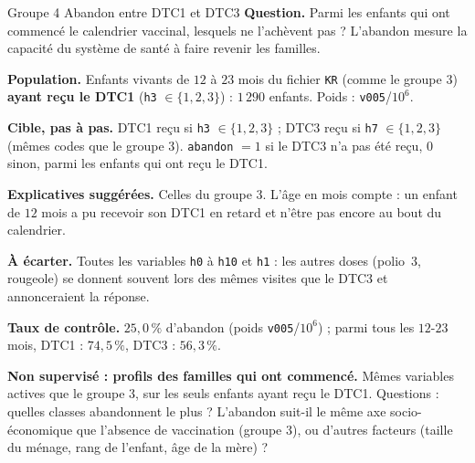 \documentclass[11pt]{article}
\begin{document}
\begin{fiche}{Groupe 4 \textendash{} Abandon entre DTC1 et DTC3}
\textbf{Question.} Parmi les enfants qui ont commencé le calendrier vaccinal, lesquels ne l'achèvent pas ? L'abandon mesure la capacité du système de santé à faire revenir les familles.

\textbf{Population.} Enfants vivants de $12$ à $23$ mois du fichier \texttt{KR} (comme le groupe 3) \textbf{ayant reçu le DTC1} (\texttt{h3} $\in\{1,2,3\}$) : $1\,290$ enfants. Poids : \texttt{v005}/$10^6$.

\textbf{Cible, pas à pas.} DTC1 reçu si \texttt{h3} $\in\{1,2,3\}$ ; DTC3 reçu si \texttt{h7} $\in\{1,2,3\}$ (mêmes codes que le groupe 3). \texttt{abandon} $=1$ si le DTC3 n'a pas été reçu, $0$ sinon, parmi les enfants qui ont reçu le DTC1.

\textbf{Explicatives suggérées.} Celles du groupe 3. L'âge en mois compte : un enfant de $12$ mois a pu recevoir son DTC1 en retard et n'être pas encore au bout du calendrier.

\textbf{À écarter.} Toutes les variables \texttt{h0} à \texttt{h10} et \texttt{h1} : les autres doses (polio~3, rougeole) se donnent souvent lors des mêmes visites que le DTC3 et annonceraient la réponse.

\textbf{Taux de contrôle.} $25{,}0\,\%$ d'abandon (poids \texttt{v005}/$10^6$) ; parmi tous les $12$-$23$ mois, DTC1 : $74{,}5\,\%$, DTC3 : $56{,}3\,\%$.

\textbf{Non supervisé : profils des familles qui ont commencé.} Mêmes variables actives que le groupe 3, sur les seuls enfants ayant reçu le DTC1. Questions : quelles classes abandonnent le plus ? L'abandon suit-il le même axe socio-économique que l'absence de vaccination (groupe 3), ou d'autres facteurs (taille du ménage, rang de l'enfant, âge de la mère) ?
\end{fiche}

\end{document}
